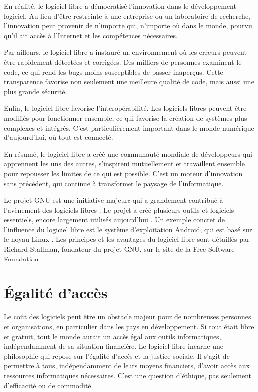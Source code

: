En réalité, le logiciel libre a démocratisé l'innovation dans le développement logiciel. Au lieu d'être restreinte à une entreprise ou un laboratoire de recherche, l'innovation peut provenir de n'importe qui, n'importe où dans le monde, pourvu qu'il ait accès à l'Internet et les compétences nécessaires.

Par ailleurs, le logiciel libre a instauré un environnement où les erreurs peuvent être rapidement détectées et corrigées. Des milliers de personnes examinent le code, ce qui rend les bugs moins susceptibles de passer inaperçus. Cette transparence favorise non seulement une meilleure qualité de code, mais aussi une plus grande sécurité.

Enfin, le logiciel libre favorise l'interopérabilité. Les logiciels libres peuvent être modifiés pour fonctionner ensemble, ce qui favorise la création de systèmes plus complexes et intégrés. C'est particulièrement important dans le monde numérique d'aujourd'hui, où tout est connecté.

En résumé, le logiciel libre a créé une communauté mondiale de développeurs qui apprennent les uns des autres, s'inspirent mutuellement et travaillent ensemble pour repousser les limites de ce qui est possible. C'est un moteur d'innovation sans précédent, qui continue à transformer le paysage de l'informatique.

Le projet GNU est une initiative majeure qui a grandement contribué à l'avènement des logiciels libres \cite{GNU}. Le projet a créé plusieurs outils et logiciels essentiels, encore largement utilisés aujourd'hui \cite{GNU_packages}. Un exemple concret de l'influence du logiciel libre est le système d'exploitation Android, qui est basé sur le noyau Linux \cite{Android_Kernel}. Les principes et les avantages du logiciel libre sont détaillés par Richard Stallman, fondateur du projet GNU, sur le site de la Free Software Foundation \cite{FSF}.


\section{Égalité d'accès}  Le coût des logiciels peut être un obstacle majeur pour de nombreuses personnes et organisations, en particulier dans les pays en développement. Si tout était libre et gratuit, tout le monde aurait un accès égal aux outils informatiques, indépendamment de sa situation financière.
Le logiciel libre incarne une philosophie qui repose sur l'égalité d'accès et la justice sociale. Il s'agit de permettre à tous, indépendamment de leurs moyens financiers, d'avoir accès aux ressources informatiques nécessaires. C'est une question d'éthique, pas seulement d'efficacité ou de commodité.

